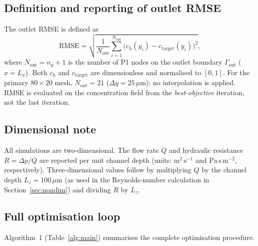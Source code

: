 \subsection{Definition and reporting of outlet RMSE}
\label{sec:metrics}
The outlet RMSE is defined as
\begin{equation}
  \mathrm{RMSE}
  = \sqrt{\frac{1}{N_{\mathrm{out}}}
          \sum_{i=1}^{N_{\mathrm{out}}}
          \bigl(c_h(y_i) - c_{\mathrm{target}}(y_i)\bigr)^2},
  \label{eq:rmse}
\end{equation}
where $N_{\mathrm{out}} = n_y + 1$ is the number of P1 nodes on the
outlet boundary $\Gamma_{\mathrm{out}}$ ($x = L_x$).
Both $c_h$ and $c_{\mathrm{target}}$ are dimensionless and normalised to
$[0,1]$.
For the primary $80\times20$ mesh, $N_{\mathrm{out}} = 21$
($\Delta y = 25\,\mu$m); no interpolation is applied.
RMSE is evaluated on the concentration field from the
\emph{best-objective} iteration, not the last iteration.

\subsection{Dimensional note}
\label{sec:dimensional}
All simulations are two-dimensional.
The flow rate $Q$ and hydraulic resistance $R = \Delta p/Q$ are reported
per unit channel depth (units: $\text{m}^2\,\text{s}^{-1}$ and
$\text{Pa}\,\text{s}\,\text{m}^{-2}$, respectively).
Three-dimensional values follow by multiplying $Q$ by the channel depth
$L_z = 100\,\mu$m (as used in the Reynolds-number calculation in
Section~\ref{sec:nondim}) and dividing $R$ by $L_z$.


\subsection{Full optimisation loop}
\label{sec:algorithm}
Algorithm~1 (Table~\ref{alg:main}) summarises the complete optimisation procedure.

